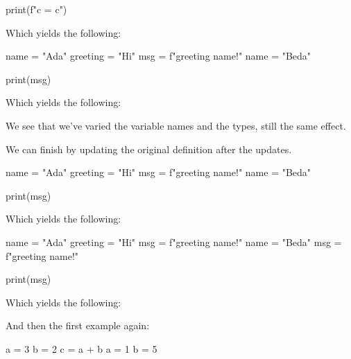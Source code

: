 \begin{description}
\begin{minipage}[t]{0.45\columnwidth}
\begin{pyblock}[varstateG1]
print(f"c = {c}")
        \end{pyblock}

        \vspace{0.5em}
        Which yields the following:
        \printpythontex[verbatim]
      \end{minipage}
      \hfill
      \begin{minipage}[t]{0.45\columnwidth}
        \begin{pyblock}[varstateG2]
name = "Ada"
greeting = "Hi"
msg = f"{greeting} {name}!"
name = "Beda"


print(msg)
        \end{pyblock}

        \vspace{0.5em}
        Which yields the following:
        \printpythontex[verbatim]
      \end{minipage}

      We see that we've varied the variable names and the types, still the same 
      effect.

      We can finish by updating the original definition after the updates.

      \begin{minipage}[t]{0.45\columnwidth}
        \begin{pyblock}[varstateG2]
name = "Ada"
greeting = "Hi"
msg = f"{greeting} {name}!"
name = "Beda"


print(msg)
        \end{pyblock}

        \vspace{0.5em}
        Which yields the following:
        \printpythontex[verbatim]
      \end{minipage}
      \hfill
      \begin{minipage}[t]{0.45\columnwidth}
        \begin{pyblock}[varstateG2][highlightlines=5]
name = "Ada"
greeting = "Hi"
msg = f"{greeting} {name}!"
name = "Beda"
msg = f"{greeting} {name}!"

print(msg)
        \end{pyblock}

        \vspace{0.5em}
        Which yields the following:
        \printpythontex[verbatim]
      \end{minipage}

      And then the first example again:

      \begin{minipage}[t]{0.45\columnwidth}
        \begin{pyblock}[varstateG1]
a = 3
b = 2
c = a + b
a = 1
b = 5


\end{pyblock}
\end{minipage}
\end{description}
